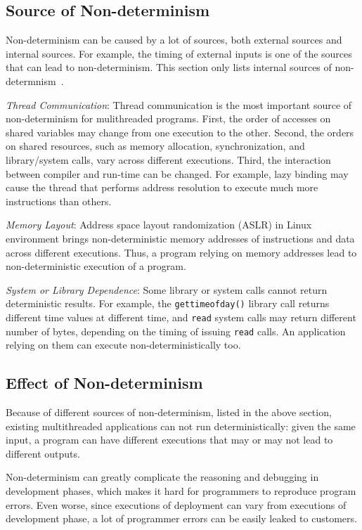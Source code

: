 \subsection{Source of Non-determinism}
Non-determinism can be caused by a lot of sources, both external sources and internal sources. For example, the timing of external inputs is one of the sources that can lead to non-determinism. This section only lists internal sources of non-determnism~\cite{costofdeterminism}. 
 
\emph{Thread Communication}: 
Thread communication is the most important source of non-determinism for mulithreaded programs. 
First, the order of accesses on shared variables may change from one execution to the other. Second, the orders on shared resources, such as memory allocation, synchronization, and library/system calls, vary across different executions. 
Third, the interaction between compiler and run-time can be changed. For example, lazy binding may cause the thread that  performs address resolution to execute much more instructions than others. 

\emph{Memory Layout}: 
Address space layout randomization (ASLR) in Linux environment brings non-deterministic memory addresses of instructions and data across different executions. Thus, a program relying on memory addresses lead to non-deterministic execution of a program. 

\emph{System or Library Dependence}:
Some library or system calls cannot return deterministic results. For example, the \texttt{gettimeofday()} library call returns different time values at different time, and \texttt{read} system calls may return different number of bytes, depending on the timing of issuing \texttt{read} calls.  An application relying on them can execute non-deterministically too. 


\subsection{Effect of Non-determinism}
Because of different sources of non-determinism, listed in the above section, existing multithreaded applications can not run deterministically: given the same input, a program can have different executions that may or may not lead to different outputs. 

Non-determinism can greatly complicate the reasoning and debugging in development phases, which makes it hard for programmers to reproduce program errors. 
Even worse, since executions of deployment can vary from executions of development phase, a lot of programmer errors can be easily leaked to customers.

